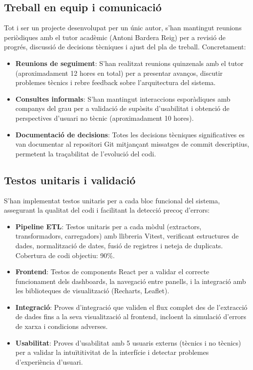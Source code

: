 \subsection{Treball en equip i comunicació}

Tot i ser un projecte desenvolupat per un únic autor, s'han mantingut reunions periòdiques amb el tutor acadèmic (Antoni Bardera Reig) per a revisió de progrés, discussió de decisions tècniques i ajust del pla de treball. Concretament:

\begin{itemize}
    \item \textbf{Reunions de seguiment}: S'han realitzat reunions quinzenals amb el tutor (aproximadament 12 hores en total) per a presentar avanços, discutir problemes tècnics i rebre feedback sobre l'arquitectura del sistema.
    \item \textbf{Consultes informals}: S'han mantingut interaccions esporàdiques amb companys del grau per a validació de supòsits d'usabilitat i obtenció de perspectives d'usuari no tècnic (aproximadament 10 hores).
    \item \textbf{Documentació de decisions}: Totes les decisions tècniques significatives es van documentar al repositori Git mitjançant missatges de commit descriptius, permetent la traçabilitat de l'evolució del codi.
\end{itemize}

\subsection{Testos unitaris i validació}

S'han implementat testos unitaris per a cada bloc funcional del sistema, assegurant la qualitat del codi i facilitant la detecció precoç d'errors:

\begin{itemize}
    \item \textbf{Pipeline ETL}: Testos unitaris per a cada mòdul (extractors, transformadors, carregadors) amb llibreria Vitest, verificant estructures de dades, normalització de dates, fusió de registres i neteja de duplicats. Cobertura de codi objectiu: 90\%.
    \item \textbf{Frontend}: Testos de components React per a validar el correcte funcionament dels dashboards, la navegació entre panells, i la integració amb les biblioteques de visualització (Recharts, Leaflet).
    \item \textbf{Integració}: Proves d'integració que validen el flux complet des de l'extracció de dades fins a la seva visualització al frontend, incloent la simulació d'errors de xarxa i condicions adverses.
    \item \textbf{Usabilitat}: Proves d'usabilitat amb 5 usuaris externs (tècnics i no tècnics) per a validar la intuïtitivitat de la interfície i detectar problemes d'experiència d'usuari.
\end{itemize}

